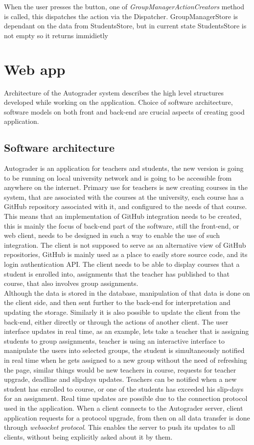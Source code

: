 When the user presses the button, one of \emph{GroupManagerActionCreators} method is called, this dispatches the action via the Dispatcher. GroupManagerStore is dependant on the data from StudentsStore, but in current state StudentsStore is not empty so it returns immidietly 

\section{Web app}
Architecture of the Autograder system describes the high level structures developed while working on the application. Choice of software architecture, software models on both front and back-end are crucial aspects of creating good application.
\subsection{Software architecture}
Autograder is an application for teachers and students, the new version is going to be running on local university network and is going to be accessible from anywhere on the internet. Primary use for teachers is new creating courses in the system, that are associated with the courses at the university, each course has a GitHub repository associated with it, and configured to the needs of that course. This means that an implementation of GitHub integration needs to be created, this is mainly the focus of back-end part of the software, still the front-end, or web client, needs to be designed in such a way to enable the use of such integration. The client is not supposed to serve as an alternative view of GitHub repositories, GitHub is mainly used as a place to easily store source code, and its login authentication API. The client needs to be able to display courses that a student is enrolled into, assignments that the teacher has published to that course, that also involves group assignments.
\\Although the data is stored in the database, manipulation of that data is done on the client side, and then sent further to the back-end for interpretation and updating the storage. Similarly it is also possible to update the client from the back-end, either directly or through the actions of another client. The user interface updates in real time, as an example, lets take a teacher that is assigning students to group assignments, teacher is using an interactive interface to manipulate the users into selected groups, the student is simultaneously notified in real time when he gets assigned to a new group without the need of refreshing the page, similar things would be new teachers in course, requests for teacher upgrade, deadline and slipdays updates. Teachers can be notified when a new student has enrolled to course, or one of the students has exceeded his slip-days for an assignment. Real time updates are possible due to the connection protocol used in the application. When a client connects to the Autograder server, client application requests for a protocol upgrade, from then on all data transfer is done through \emph{websocket protocol}\cite{websocket}. This enables the server to push its updates to all clients, without being explicitly asked about it by them.
